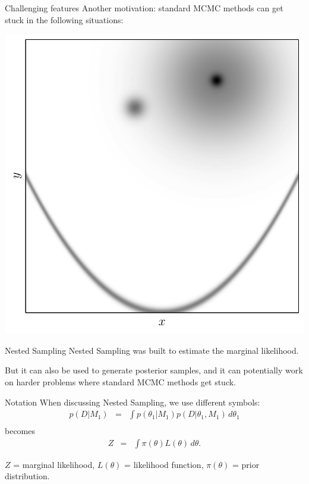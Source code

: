 \documentclass{beamer}
\begin{document}
\begin{frame}[t]{Challenging features}
Another motivation: standard MCMC methods can get stuck in the following
situations:
\begin{center}
\includegraphics[scale=0.4]{challenges.pdf}
\end{center}
\end{frame}

\begin{frame}{Nested Sampling}
Nested Sampling was built to estimate the marginal likelihood.

But it can also be used to generate posterior samples, and it can potentially
work on harder problems where standard MCMC methods get stuck.
\end{frame}

\begin{frame}[t]{Notation}
When discussing Nested Sampling, we use different symbols:
\begin{eqnarray*}
p(D | M_1) &=& \int p(\theta_1 | M_1) p(D | \theta_1, M_1) \, d\theta_1\\
\end{eqnarray*}
becomes
\begin{eqnarray*}
Z &=& \int \pi(\theta) L(\theta) \, d\theta.
\end{eqnarray*}

$Z$ = marginal likelihood, $L(\theta)$ = likelihood function, $\pi(\theta)$ = prior
distribution.
\end{frame}
\end{document}
